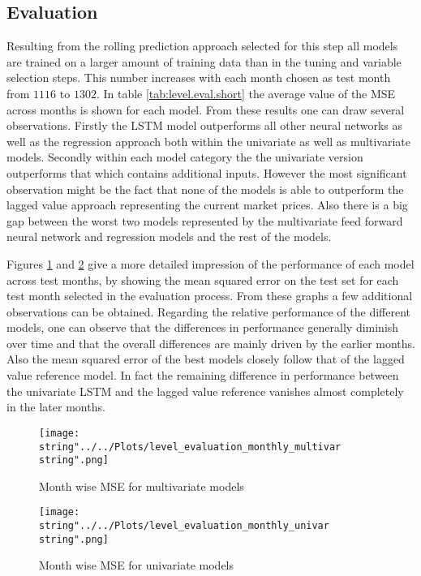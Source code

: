 \subsection{Evaluation}
Resulting from the rolling prediction approach selected for this step all models are trained on a larger amount of training data than in the tuning and variable selection steps. This number increases with each month chosen as test month from $1116$ to $1302$. In table \ref{tab:level.eval.short} the average value of the MSE across months is shown for each model. From these results one can draw several observations. Firstly the LSTM model outperforms all other neural networks as well as the regression approach both within the univariate as well as multivariate models. Secondly within each model category the the univariate version outperforms that which contains additional inputs. However the most significant observation  might be the fact that none of the models is able to outperform the lagged value approach representing the current market prices. Also there is a big gap between the worst two models represented by the multivariate feed forward neural network and regression models and the rest of the models.

Figures \ref{fig:level_evaluation_monthly_multivar} and \ref{fig:level_evaluation_monthly_univar} give  a more detailed impression of the performance of each model across test months, by showing the mean squared error on the test set for each test month selected in the evaluation process. From these graphs a few additional observations can be obtained. Regarding the relative performance of the different models, one can observe that the differences in performance generally diminish over time and that the  overall differences are mainly driven by the earlier months. Also the mean squared error of the best models closely follow that of the lagged value reference model. In fact the remaining difference in performance between the univariate LSTM and the lagged value reference vanishes almost completely in the later months.

\begin{figure}[h!]
  \centering
\texttt{[image: \\string"../../Plots/level\_evaluation\_monthly\_multivar\\string".png]}
  \caption{Month wise MSE for multivariate models}\label{fig:level_evaluation_monthly_multivar}
\end{figure}

\begin{figure}[h!]
  \centering
\texttt{[image: \\string"../../Plots/level\_evaluation\_monthly\_univar\\string".png]}
  \caption{Month wise MSE for univariate models}\label{fig:level_evaluation_monthly_univar}
\end{figure}

